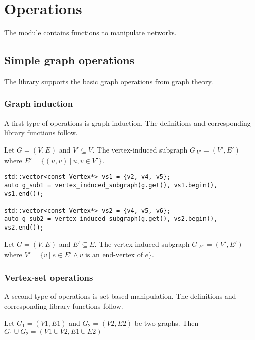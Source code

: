 \chapter{Operations}

The  module contains functions to manipulate networks.
    
\section{Simple graph operations}

The library supports the basic graph operations from graph theory.

\subsection{Graph induction}

A first type of operations is graph induction. The definitions and corresponding library functions follow.

\begin{definition}
Let $G = (V, E)$ and $V' \subseteq V$. The vertex-induced subgraph $G_{|V'} = (V', E')$ where $ E' = \{ (u,v) \ | \ u, v  \in V' \}$.
\end{definition}

\begin{lstlisting}[style=c++]
std::vector<const Vertex*> vs1 = {v2, v4, v5};
auto g_sub1 = vertex_induced_subgraph(g.get(), vs1.begin(), vs1.end());
    
std::vector<const Vertex*> vs2 = {v4, v5, v6};
auto g_sub2 = vertex_induced_subgraph(g.get(), vs2.begin(), vs2.end());
\end{lstlisting}

\begin{definition}
Let $G = (V, E)$ and $E' \subseteq E$. The vertex-induced subgraph $G_{|E'} = (V', E')$ where $ V' = \{ v \ | \ e  \in E' \land v \mbox{ is an end-vertex of } e \}$.
\end{definition}

\subsection{Vertex-set operations}

A second type of operations is set-based manipulation. The definitions and corresponding library functions follow.

\begin{definition}[Union]
Let $G_1 = (V1, E1)$ and $G_2 = (V2, E2)$ be two graphs. Then $G_1 \cup G_2 = (V1 \cup V2, E1 \cup E2)$
\end{definition}


